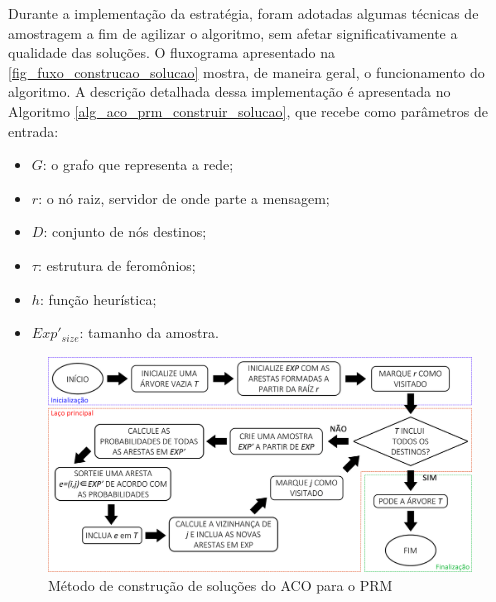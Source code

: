 Durante a implementação da estratégia, foram adotadas algumas técnicas de amostragem a fim de agilizar o algoritmo, sem afetar significativamente a qualidade das soluções. O fluxograma apresentado na \autoref{fig_fuxo_construcao_solucao} mostra, de maneira geral, o funcionamento do algoritmo. A descrição detalhada dessa implementação é apresentada no Algoritmo \ref{alg_aco_prm_construir_solucao}, que recebe como parâmetros de entrada:

\begin{itemize}
	\item $G$: o grafo que representa a rede;
	\item $r$: o nó raiz, servidor de onde parte a mensagem;
	\item $D$: conjunto de nós destinos;
	\item $\tau$: estrutura de feromônios;
	\item $h$: função heurística;
	\item $Exp'_{size}$: tamanho da amostra.
\end{itemize}

\begin{figure}[!htbp]	
	\includegraphics[width=1\textwidth]{cap_algoritmo-proposto/figs/fluxo-construcao-solucao}
	\caption{\label{fig_fuxo_construcao_solucao}Método de construção de soluções do ACO para o PRM}
\end{figure}

